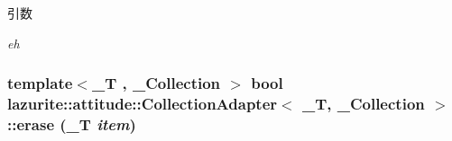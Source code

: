 \begin{DoxyParams}{引数}
\item[{\em eh}]\end{DoxyParams}
\hypertarget{classlazurite_1_1attitude_1_1_collection_adapter_3_01___t_00_01___collection_01_4_ac43266718a4dabb625053c881b2ae418}{
\subsubsection[{erase}]{\setlength{\rightskip}{0pt plus 5cm}template$<$\_\-T , \_\-Collection $>$ bool lazurite::attitude::CollectionAdapter$<$ \_\-T, \_\-Collection $>$::erase (\_\-T {\em item})}}
\label{classlazurite_1_1attitude_1_1_collection_adapter_3_01___t_00_01___collection_01_4_ac43266718a4dabb625053c881b2ae418}

